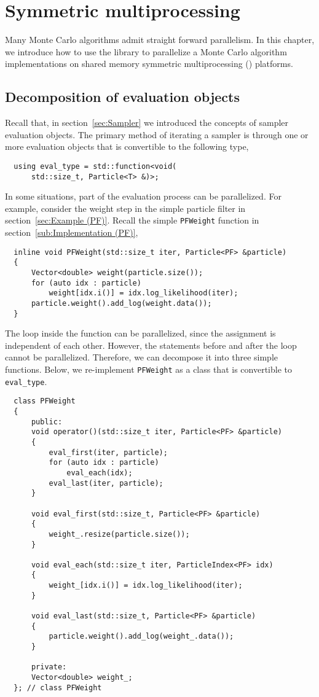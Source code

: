 \chapter{Symmetric multiprocessing}
\label{chap:Symmetric multiprocessing}

Many Monte Carlo algorithms admit straight forward parallelism. In this
chapter, we introduce how to use the library to parallelize a Monte Carlo
algorithm implementations on shared memory symmetric multiprocessing (\smp)
platforms.

\section{Decomposition of evaluation objects}
\label{sec:Decomposition of evaluation objects}

Recall that, in section~\ref{sec:Sampler} we introduced the concepts of sampler
evaluation objects. The primary method of iterating a sampler is through
one or more evaluation objects that is convertible to the following type,
\begin{Verbatim}
  using eval_type = std::function<void(
      std::size_t, Particle<T> &)>;
\end{Verbatim}
In some situations, part of the evaluation process can be parallelized. For
example, consider the weight step in the simple particle filter in
section~\ref{sec:Example (PF)}. Recall the simple \verb|PFWeight| function in
section~\ref{sub:Implementation (PF)},
\begin{Verbatim}
  inline void PFWeight(std::size_t iter, Particle<PF> &particle)
  {
      Vector<double> weight(particle.size());
      for (auto idx : particle)
          weight[idx.i()] = idx.log_likelihood(iter);
      particle.weight().add_log(weight.data());
  }
\end{Verbatim}
The loop inside the function can be parallelized, since the assignment is
independent of each other. However, the statements before and after the loop
cannot be parallelized. Therefore, we can decompose it into three simple
functions. Below, we re-implement \verb|PFWeight| as a class that is
convertible to \verb|eval_type|.
\begin{Verbatim}
  class PFWeight
  {
      public:
      void operator()(std::size_t iter, Particle<PF> &particle)
      {
          eval_first(iter, particle);
          for (auto idx : particle)
              eval_each(idx);
          eval_last(iter, particle);
      }

      void eval_first(std::size_t, Particle<PF> &particle)
      {
          weight_.resize(particle.size());
      }

      void eval_each(std::size_t iter, ParticleIndex<PF> idx)
      {
          weight_[idx.i()] = idx.log_likelihood(iter);
      }

      void eval_last(std::size_t, Particle<PF> &particle)
      {
          particle.weight().add_log(weight_.data());
      }

      private:
      Vector<double> weight_;
  }; // class PFWeight
\end{Verbatim}
